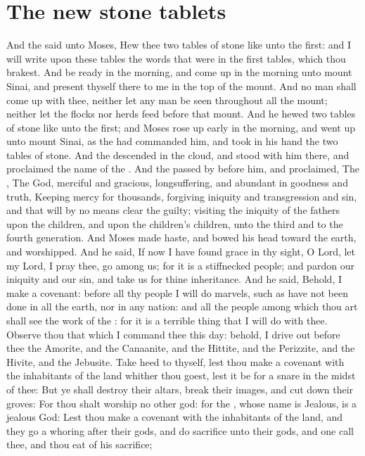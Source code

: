 \section*{The new stone tablets}
\begin{biblechapter} %
\verse And the \LORD said unto Moses, Hew thee two tables of stone like unto the first: and I will write upon these tables the words that were in the first tables, which thou brakest.
\verse And be ready in the morning, and come up in the morning unto mount Sinai, and present thyself there to me in the top of the mount.
\verse And no man shall come up with thee, neither let any man be seen throughout all the mount; neither let the flocks nor herds feed before that mount.
\verse And he hewed two tables of stone like unto the first; and Moses rose up early in the morning, and went up unto mount Sinai, as the \LORD had commanded him, and took in his hand the two tables of stone.
\verse And the \LORD descended in the cloud, and stood with him there, and proclaimed the name of the \LORD.
\verse And the \LORD passed by before him, and proclaimed, The \LORD, The \LORD God, merciful and gracious, longsuffering, and abundant in goodness and truth,
\verse Keeping mercy for thousands, forgiving iniquity and transgression and sin, and that will by no means clear the guilty; visiting the iniquity of the fathers upon the children, and upon the children's children, unto the third and to the fourth generation.
\verse And Moses made haste, and bowed his head toward the earth, and worshipped.
\verse And he said, If now I have found grace in thy sight, O Lord, let my Lord, I pray thee, go among us; for it is a stiffnecked people; and pardon our iniquity and our sin, and take us for thine inheritance.
\verse And he said, Behold, I make a covenant: before all thy people I will do marvels, such as have not been done in all the earth, nor in any nation: and all the people among which thou art shall see the work of the \LORD: for it is a terrible thing that I will do with thee.
\verse Observe thou that which I command thee this day: behold, I drive out before thee the Amorite, and the Canaanite, and the Hittite, and the Perizzite, and the Hivite, and the Jebusite.
\verse Take heed to thyself, lest thou make a covenant with the inhabitants of the land whither thou goest, lest it be for a snare in the midst of thee:
\verse But ye shall destroy their altars, break their images, and cut down their groves:
\verse For thou shalt worship no other god: for the \LORD, whose name is Jealous, is a jealous God:
\verse Lest thou make a covenant with the inhabitants of the land, and they go a whoring after their gods, and do sacrifice unto their gods, and one call thee, and thou eat of his sacrifice;

\end{biblechapter}
